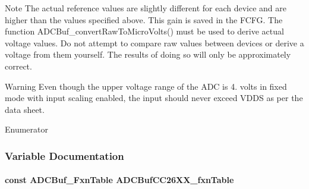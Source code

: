 \begin{DoxyNote}{Note}
The actual reference values are slightly different for each device and are higher than the values specified above. This gain is saved in the F\+C\+F\+G. The function A\+D\+C\+Buf\+\_\+convert\+Raw\+To\+Micro\+Volts() must be used to derive actual voltage values. Do not attempt to compare raw values between devices or derive a voltage from them yourself. The results of doing so will only be approximately correct.
\end{DoxyNote}
\begin{DoxyWarning}{Warning}
Even though the upper voltage range of the A\+D\+C is 4. volts in fixed mode with input scaling enabled, the input should never exceed V\+D\+D\+S as per the data sheet. 
\end{DoxyWarning}
\begin{Desc}
\item[Enumerator]\par
\begin{description}
\item[{\em 
A\+D\+C\+Buf\+C\+C26\+X\+X\+\_\+\+F\+I\+X\+E\+D\+\_\+\+R\+E\+F\+E\+R\+E\+N\+C\+E\label{_a_d_c_buf_c_c26_x_x_8h_a31a41d718712f3d4ff936bb566da0d0aad02c445be8959c127744cfe9519d1770}
}]\item[{\em 
A\+D\+C\+Buf\+C\+C26\+X\+X\+\_\+\+V\+D\+D\+S\+\_\+\+R\+E\+F\+E\+R\+E\+N\+C\+E\label{_a_d_c_buf_c_c26_x_x_8h_a31a41d718712f3d4ff936bb566da0d0aa4b0c0d3239bf0e32219c87df11baa0c9}
}]\end{description}
\end{Desc}


\subsubsection{Variable Documentation}
\paragraph[{A\+D\+C\+Buf\+C\+C26\+X\+X\+\_\+fxn\+Table}]{\setlength{\rightskip}{0pt plus 5cm}const {\bf A\+D\+C\+Buf\+\_\+\+Fxn\+Table} A\+D\+C\+Buf\+C\+C26\+X\+X\+\_\+fxn\+Table}\label{_a_d_c_buf_c_c26_x_x_8h_ab26fa75463dae8b7a8c9d7585735177a}
